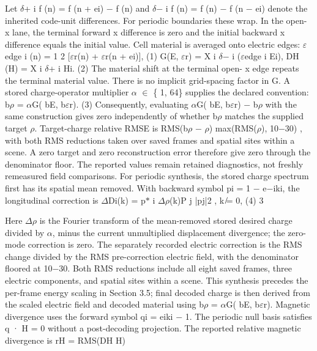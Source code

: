 \documentclass[11pt]{article}
\begin{document}
Let \ensuremath{\delta}+
i f (n) = f (n + ei) \ensuremath{-} f (n) and \ensuremath{\delta}\ensuremath{-}
i f (n) = f (n) \ensuremath{-} f (n \ensuremath{-} ei) denote the inherited code-unit
differences. For periodic boundaries these wrap. In the open- x lane, the terminal forward x
difference is zero and the initial backward x difference equals the initial value. Cell material is
averaged onto electric edges:
\ensuremath{\varepsilon}edge
i (n) = 1
2 [\ensuremath{\varepsilon}r(n) + \ensuremath{\varepsilon}r(n + ei)], (1)
G(E, \ensuremath{\varepsilon}r) =
X
i
\ensuremath{\delta}\ensuremath{-}
i (\ensuremath{\varepsilon}edge
i Ei), DH (H) =
X
i
\ensuremath{\delta}+
i Hi. (2)
The material shift at the terminal open- x edge repeats the terminal material value. There is no
implicit grid-spacing factor in G. A stored charge-operator multiplier \ensuremath{\alpha} \ensuremath{\in} \{ 1, 64\} supplies the
declared convention:
b\ensuremath{\rho} = \ensuremath{\alpha}G( bE, b\ensuremath{\varepsilon}r). (3)
Consequently, evaluating \ensuremath{\alpha}G( bE, b\ensuremath{\varepsilon}r) \ensuremath{-} b\ensuremath{\rho} with the same construction gives zero independently of
whether b\ensuremath{\rho} matches the supplied target \ensuremath{\rho}. Target-charge relative RMSE is
RMS(b\ensuremath{\rho} \ensuremath{-} \ensuremath{\rho})
max(RMS(\ensuremath{\rho}), 10\ensuremath{-}30) ,
with both RMS reductions taken over saved frames and spatial sites within a scene. A zero target
and zero reconstruction error therefore give zero through the denominator floor. The reported
values remain retained diagnostics, not freshly remeasured field comparisons.
For periodic synthesis, the stored charge spectrum first has its spatial mean removed. With
backward symbol pi = 1 \ensuremath{-} e\ensuremath{-}iki, the longitudinal correction is
\ensuremath{\Delta}Di(k) = p\ensuremath{\ast}
i \ensuremath{\Delta}\ensuremath{\rho}(k)P
j |pj|2 , k ̸= 0, (4)
3

Here \ensuremath{\Delta}\ensuremath{\rho} is the Fourier transform of the mean-removed stored desired charge divided by \ensuremath{\alpha}, minus
the current unmultiplied displacement divergence; the zero-mode correction is zero. The separately
recorded electric correction is the RMS change divided by the RMS pre-correction electric field,
with the denominator floored at 10\ensuremath{-}30. Both RMS reductions include all eight saved frames, three
electric components, and spatial sites within a scene. This synthesis precedes the per-frame energy
scaling in Section 3.5; final decoded charge is then derived from the scaled electric field and decoded
material using b\ensuremath{\rho} = \ensuremath{\alpha}G( bE, b\ensuremath{\varepsilon}r).
Magnetic divergence uses the forward symbol qi = eiki \ensuremath{-} 1. The periodic null basis satisfies
q · H = 0 without a post-decoding projection. The reported relative magnetic divergence is
rH = RMS(DH H)
\end{document}
